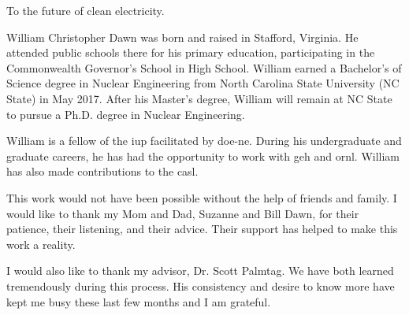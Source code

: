 \makecopyrightpage

\maketitlepage

\begin{dedication}
  \centering To the future of clean electricity.
\end{dedication}

\begin{biography}
  William Christopher Dawn was born and raised in Stafford, Virginia. He 
  attended public schools there for his primary education, participating in the
  Commonwealth Governor's School in High School. William earned a Bachelor's of
  Science degree in Nuclear Engineering from North Carolina State University (NC
  State) in May 2017. After his Master's degree, William will remain at NC State
  to pursue a Ph.D. degree in Nuclear Engineering. 

  William is a fellow of the \gls{iup} facilitated by \gls{doe-ne}. During his
  undergraduate and graduate careers, he has had the opportunity to work with
  \gls{geh} and \gls{ornl}. William has also made contributions to the
  \gls{casl}.
\end{biography}
\glsresetall

\begin{acknowledgements}
  This work would not have been possible without the help of friends and family.
  I would like to thank my Mom and Dad, Suzanne and Bill Dawn, for their
  patience, their listening, and their advice. Their support has helped to make
  this work a reality.

  I would also like to thank my advisor, Dr. Scott Palmtag. We have both learned
  tremendously during this process. His consistency and desire to know more have
  kept me busy these last few months and I am grateful.
\end{acknowledgements}

\thesistableofcontents

\thesislistoftables

\thesislistoffigures

\clearpage
\printglossary[type=\acronymtype,title={LIST OF ACRONYMS},nonumberlist]
\glsresetall
